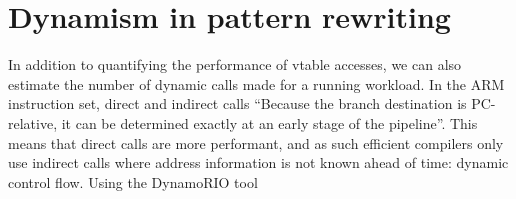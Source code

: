 








\section{Dynamism in pattern rewriting}
\label{chap:dynamism-pattern-rewriting-summary}



In addition to quantifying the performance of \ac{vtable} accesses, we can also estimate the number of dynamic calls made for a running workload.
In the ARM instruction set, direct and indirect calls \cite{armlimitedARMCortexRSeries}
``Because the branch destination is PC-relative, it can be determined exactly at an early stage of the pipeline''. This means that direct calls are more performant, and as such efficient compilers only use indirect calls where address information is not known ahead of time: dynamic control flow.
Using the DynamoRIO tool

